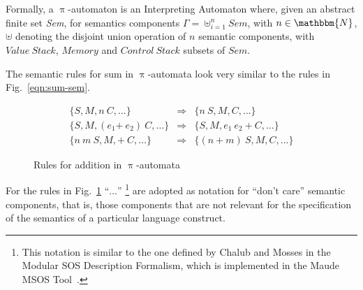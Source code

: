 \documentclass{llncs}%
\begin{document}
Formally, a $\uppi$-automaton is an Interpreting Automaton where, given an abstract finite set \emph{Sem}, for semantics components $\Gamma = \uplus^n_{i=1} \mathit{Sem}$, with $n
\in \mathbbm{N}$, $\uplus$ denoting the disjoint union operation of
$n$ semantic components, with $\mathit{Value~Stack}$, $\mathit{Memory}$ and $\mathit{Control~Stack}$ subsets of $\mathit{Sem}$.
%


The semantic rules for sum in $\uppi$-automata look
very similar to the rules in Fig.~\ref{eqn:sum-sem}.
\begin{figure}
\begin{eqnarray}
\label{eq:gia-val} \{ S, M, n~ C, \ldots \} & \Rightarrow & \{ n ~ S, M, C, \ldots \} \\
\label{eq:gia-add1}\{ S, M, (e_1 \mathtt{+}~ e_2) ~ C, \ldots \} & \Rightarrow &
\label{eq:gia-add2}\{ S, M, e_1 ~ e_2 ~ \mathtt{+}~ C, \ldots \} \\
\{ n ~ m ~ S, M, \mathtt{+}~ C , \ldots \} & \Rightarrow & \{ (n + m)~
S, M, C, \ldots \}
\end{eqnarray}
\caption{Rules for addition in $\uppi$-automata}\label{eqn:gia-sum-sem}
\end{figure}
For the rules in Fig.~\ref{eqn:gia-sum-sem} 
``$\ldots$'' \footnote{This notation is similar to the one defined by
  Chalub and Mosses in the Modular SOS Description Formalism, which is
  implemented in the Maude MSOS Tool~\cite{wrla06}.} are adopted as notation for
``don't care'' semantic components, that is, those components that are
not relevant for the specification of the semantics of a particular
language construct.
\end{document}

